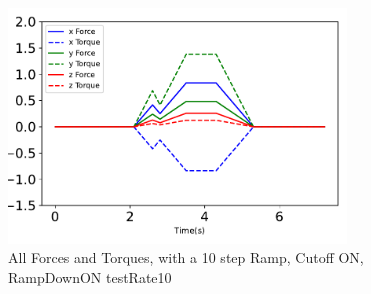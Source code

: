 \begin{figure}[htbp]\centerline{\includegraphics[width=0.8\textwidth]{AutoTeX/Ramp_10steps_CutoffONrampDownON_testRate10}}\caption{All Forces and Torques, with a 10 step Ramp, Cutoff ON, RampDownON testRate10}\label{fig:Ramp_10steps_CutoffONrampDownON_testRate10}\end{figure}